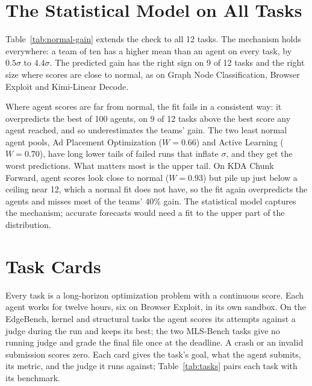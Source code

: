 \documentclass[numbers,10pt]{arxiv}
\begin{document}
\section{The Statistical Model on All Tasks}
\label{app:normal-all}

Table~\ref{tab:normal-gain} extends the check to all 12 tasks. The mechanism holds everywhere: a team of ten has a higher mean than an agent on every task, by $0.5\sigma$ to $4.4\sigma$. The predicted gain has the right sign on 9 of 12 tasks and the right size where scores are close to normal, as on Graph Node Classification, Browser Exploit and Kimi-Linear Decode.

Where agent scores are far from normal, the fit fails in a consistent way: it overpredicts the best of 100 agents, on 9 of 12 tasks above the best score any agent reached, and so underestimates the teams' gain. The two least normal agent pools, Ad Placement Optimization ($W=0.66$) and Active Learning ($W=0.70$), have long lower tails of failed runs that inflate $\sigma$, and they get the worst predictions. What matters most is the upper tail. On KDA Chunk Forward, agent scores look close to normal ($W=0.93$) but pile up just below a ceiling near 12, which a normal fit does not have, so the fit again overpredicts the agents and misses most of the teams' 40\% gain. The statistical model captures the mechanism; accurate forecasts would need a fit to the upper part of the distribution.

\section{Task Cards}
\label{app:tasks}
Every task is a long-horizon optimization problem with a continuous score. Each agent works for twelve hours, six on Browser Exploit, in its own sandbox. On the EdgeBench, kernel and structural tasks the agent scores its attempts against a judge during the run and keeps its best; the two MLS-Bench tasks give no running judge and grade the final file once at the deadline. A crash or an invalid submission scores zero. Each card gives the task's goal, what the agent submits, its metric, and the judge it runs against; Table~\ref{tab:tasks} pairs each task with its benchmark.
\end{document}
